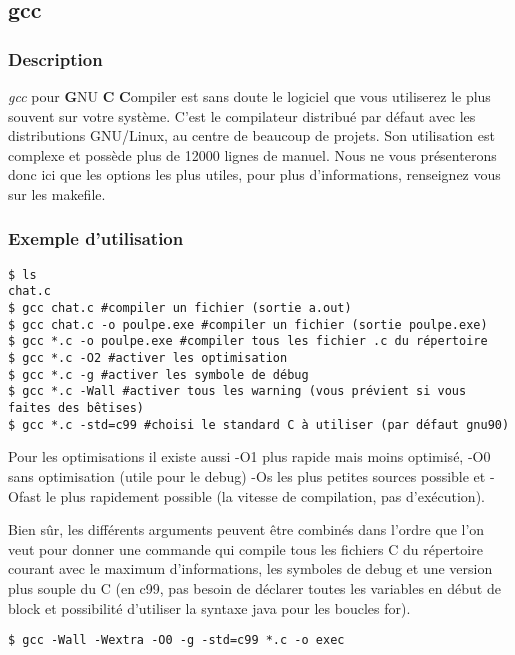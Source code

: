 \subsection*{gcc}
\subsubsection*{Description}
\emph{gcc} pour \textbf{G}NU \textbf{C} \textbf{C}ompiler est sans doute le logiciel que vous utiliserez le plus souvent sur votre système.
C'est le compilateur distribué par défaut avec les distributions GNU/Linux, au centre de beaucoup de projets. Son utilisation est complexe et possède plus de 12000 lignes de manuel.
Nous ne vous présenterons donc ici que les options les plus utiles,
pour plus d'informations, renseignez vous sur les makefile.

\subsubsection*{Exemple d'utilisation}

\begin{lstlisting}
$ ls
chat.c
$ gcc chat.c #compiler un fichier (sortie a.out)
$ gcc chat.c -o poulpe.exe #compiler un fichier (sortie poulpe.exe)
$ gcc *.c -o poulpe.exe #compiler tous les fichier .c du répertoire
$ gcc *.c -O2 #activer les optimisation 
$ gcc *.c -g #activer les symbole de débug
$ gcc *.c -Wall #activer tous les warning (vous prévient si vous faites des bêtises)
$ gcc *.c -std=c99 #choisi le standard C à utiliser (par défaut gnu90)
\end{lstlisting}

Pour les optimisations il existe aussi -O1 plus rapide mais moins optimisé, -O0 sans optimisation (utile pour le debug) -Os les plus petites sources possible et -Ofast le plus rapidement possible (la vitesse de compilation, pas d'exécution).

Bien sûr, les différents arguments peuvent être combinés dans l'ordre que l'on veut pour donner une commande qui compile tous les fichiers C du répertoire courant avec le maximum d'informations, les symboles de debug et une version plus souple du C (en c99, pas besoin de déclarer toutes les variables en début de block et possibilité d'utiliser la syntaxe java pour les boucles for).
\begin{lstlisting}
$ gcc -Wall -Wextra -O0 -g -std=c99 *.c -o exec
\end{lstlisting}
